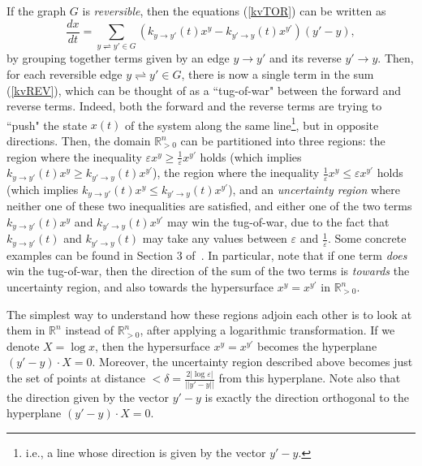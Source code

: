 \documentclass[12pt,letterpaper]{article}
\newcommand{\RR}{\mathbb{R}}
\newcommand{\eps}{\varepsilon}
\begin{document}

%


If the graph $G$ is {\em reversible}, then the equations (\ref{kvTOR}) can be written as 
\begin{equation}\label{kvREV}
\frac{dx}{dt} = \sum_{y\rightleftharpoons y'\in G} \left( k_{y\to y'}(t)x^{y} - k_{y'\to y}(t)x^{y'} \right) (y' - y), 
\end{equation}
by grouping together terms given by an edge $y\to y'$ and its reverse $y'\to y$. Then, for each reversible edge $y\rightleftharpoons y'\in G$, there is now a single term in the sum (\ref{kvREV}), which can be thought of as a ``tug-of-war" between the forward and reverse terms. Indeed, both the forward and the reverse terms are trying to ``push" the state $x(t)$ of the system along the same line\footnote{
i.e., a line whose direction is given by the vector $y' - y$.
}, but in opposite directions. Then, the domain $\RR^n_{>0}$ can be partitioned into three regions: the region where the inequality $\eps x^{y} \ge \frac{1}{\eps} x^{y'}$ holds (which implies $k_{y\to y'}(t)x^{y} \ge k_{y'\to y}(t)x^{y'}$), the region where the inequality $\frac{1}{\eps} x^{y} \le \eps x^{y'}$ holds (which implies $k_{y\to y'}(t)x^{y} \le k_{y'\to y}(t)x^{y'}$), and an {\em uncertainty region} where neither one of these two inequalities are satisfied, and either one of the two terms $k_{y\to y'}(t)x^y$ and $k_{y'\to y}(t)x^{y'}$ may win the tug-of-war, due to the fact that $k_{y\to y'}(t)$ and $k_{y'\to y}(t)$ may take any values between $\eps$ and $\frac{1}{\eps}$. 
Some concrete examples can be found in Section 3 of~\cite{CNP}. In particular, note that if one term {\em does} win the tug-of-war, then the direction of the sum of the two terms is {\em towards} the uncertainty region, and also towards the hypersurface $x^{y} = x^{y'}$ in $\RR^n_{>0}$. 

The simplest way to understand how these regions adjoin each other is to look at them in $\RR^n$ instead of $\RR^n_{>0}$, after applying a logarithmic transformation. If we denote $X=\log x$, then the hypersurface $x^{y} = x^{y'}$ becomes the hyperplane $(y'-y)\cdot X = 0$. Moreover, the uncertainty region described above becomes just the set of points at distance $<\delta = \frac{2 |\!\log\eps|}{||y'-y||}$ from this hyperplane. Note also that  the  direction given by the vector $y' - y$ is exactly the direction orthogonal to the hyperplane $(y'-y)\cdot X = 0$. 
\end{document}
